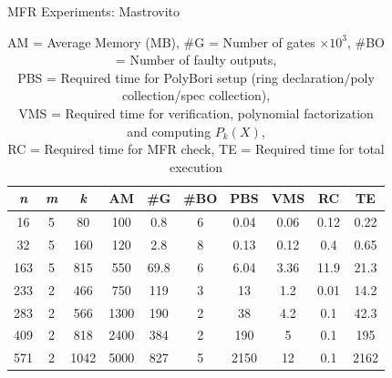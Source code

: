 



\begin{frame}{\large MFR Experiments: Mastrovito}


{\scriptsize
\begin{table}[bht]
\centering
\caption*{{\scriptsize  
AM = Average Memory (MB),
\#G = Number of gates $\times 10^3$, \#BO = Number of faulty outputs, 
\\PBS = Required time for PolyBori setup (ring declaration/poly collection/spec collection),
\\VMS = Required time for verification, polynomial factorization and computing $P_k(X)$, \\
RC = Required time for MFR check, TE = Required time for total execution}}
\label{masvsspec}
\begin{tabular}{| c | c | c | c | c | c | c | c | c | c |} \hline
{\textit{\textbf{n}}} & {\textit{\textbf{m}}} & {\textit{\textbf{k}}} & {\textbf{AM}} & {\textbf{\#G}} 
& {\textbf{\#BO}} & {\textbf{PBS}} & {\textbf{VMS}} & {\textbf{RC}} & {\textbf{TE}} \\ \hline 
16  & 5 & 80   & 100 & 0.8  & 6  & 0.04 & 0.06  & 0.12  & 0.22 \\ \hline
32  & 5 & 160  & 120 & 2.8  & 8  & 0.13 & 0.12  & 0.4   & 0.65 \\ \hline
163 & 5 & 815  & 550 & 69.8 & 6  & 6.04 & 3.36  & 11.9  & 21.3 \\ \hline
233 & 2 & 466  & 750 & 119  & 3  & 13   & 1.2   & 0.01  & 14.2 \\ \hline
283 & 2 & 566  & 1300& 190  & 2  & 38   & 4.2   & 0.1   & 42.3 \\ \hline
409 & 2 & 818  & 2400& 384  & 2  & 190  & 5     & 0.1   & 195  \\ \hline
\rowcolor{green}571 & 2 & 1042 & 5000& 827  & 5  & 2150 & 12    & 0.1   & 2162 \\ \hline
\end{tabular}
\end{table}}

\end{frame}

